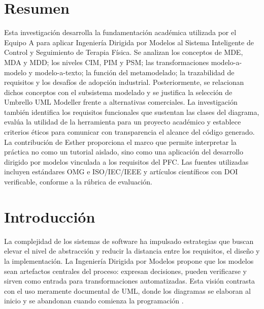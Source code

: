 



\tableofcontents
\clearpage
{}

\section{Resumen}
Esta investigación desarrolla la fundamentación académica utilizada por el Equipo A para aplicar Ingeniería Dirigida por Modelos al Sistema Inteligente de Control y Seguimiento de Terapia Física. Se analizan los conceptos de MDE, MDA y MDD; los niveles CIM, PIM y PSM; las transformaciones modelo-a-modelo y modelo-a-texto; la función del metamodelado; la trazabilidad de requisitos y los desafíos de adopción industrial. Posteriormente, se relacionan dichos conceptos con el subsistema modelado y se justifica la selección de Umbrello UML Modeller frente a alternativas comerciales. La investigación también identifica los requisitos funcionales que sustentan las clases del diagrama, evalúa la utilidad de la herramienta para un proyecto académico y establece criterios éticos para comunicar con transparencia el alcance del código generado. La contribución de Esther proporciona el marco que permite interpretar la práctica no como un tutorial aislado, sino como una aplicación del desarrollo dirigido por modelos vinculada a los requisitos del PFC. Las fuentes utilizadas incluyen estándares OMG e ISO/IEC/IEEE y artículos científicos con DOI verificable, conforme a la rúbrica de evaluación.

\section{Introducción}
La complejidad de los sistemas de software ha impulsado estrategias que buscan elevar el nivel de abstracción y reducir la distancia entre los requisitos, el diseño y la implementación. La Ingeniería Dirigida por Modelos propone que los modelos sean artefactos centrales del proceso: expresan decisiones, pueden verificarse y sirven como entrada para transformaciones automatizadas. Esta visión contrasta con el uso meramente documental de UML, donde los diagramas se elaboran al inicio y se abandonan cuando comienza la programación \cite{Schmidt2006,Selic2003}.


